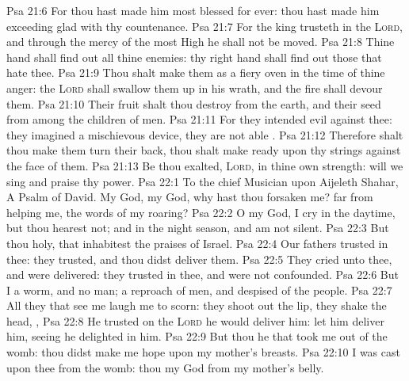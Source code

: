 \vs Psa 21:6 For thou hast made him most blessed for ever: thou hast made him exceeding glad with thy countenance.
\vs Psa 21:7 For the king trusteth in the \textsc{Lord}, and through the mercy of the most High he shall not be moved.
\vs Psa 21:8 Thine hand shall find out all thine enemies: thy right hand shall find out those that hate thee.
\vs Psa 21:9 Thou shalt make them as a fiery oven in the time of thine anger: the \textsc{Lord} shall swallow them up in his wrath, and the fire shall devour them.
\vs Psa 21:10 Their fruit shalt thou destroy from the earth, and their seed from among the children of men.
\vs Psa 21:11 For they intended evil against thee: they imagined a mischievous device,  they are not able .
\vs Psa 21:12 Therefore shalt thou make them turn their back,  thou shalt make ready  upon thy strings against the face of them.
\vs Psa 21:13 Be thou exalted, \textsc{Lord}, in thine own strength:  will we sing and praise thy power.
\vs Psa 22:1 To the chief Musician upon Aijeleth Shahar, A Psalm of David. My God, my God, why hast thou forsaken me?  far from helping me,  the words of my roaring?
\vs Psa 22:2 O my God, I cry in the daytime, but thou hearest not; and in the night season, and am not silent.
\vs Psa 22:3 But thou  holy,  that inhabitest the praises of Israel.
\vs Psa 22:4 Our fathers trusted in thee: they trusted, and thou didst deliver them.
\vs Psa 22:5 They cried unto thee, and were delivered: they trusted in thee, and were not confounded.
\vs Psa 22:6 But I  a worm, and no man; a reproach of men, and despised of the people.
\vs Psa 22:7 All they that see me laugh me to scorn: they shoot out the lip, they shake the head, ,
\vs Psa 22:8 He trusted on the \textsc{Lord}  he would deliver him: let him deliver him, seeing he delighted in him.
\vs Psa 22:9 But thou  he that took me out of the womb: thou didst make me hope  upon my mother's breasts.
\vs Psa 22:10 I was cast upon thee from the womb: thou  my God from my mother's belly.
